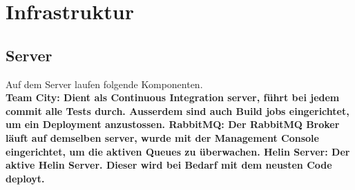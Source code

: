 \newpage

\chapter{Infrastruktur}

\section{Server}
Auf dem Server laufen folgende Komponenten. \\
\bf{Team City: } Dient als Continuous Integration server, führt bei jedem commit alle Tests durch. Ausserdem sind auch Build jobs eingerichtet, um ein Deployment anzustossen.
\bf{RabbitMQ: } Der RabbitMQ Broker läuft auf demselben server, wurde mit der Management Console eingerichtet, um die aktiven Queues zu überwachen.
\bf{Helin Server: } Der aktive Helin Server. Dieser wird bei Bedarf mit dem neusten Code deployt.


